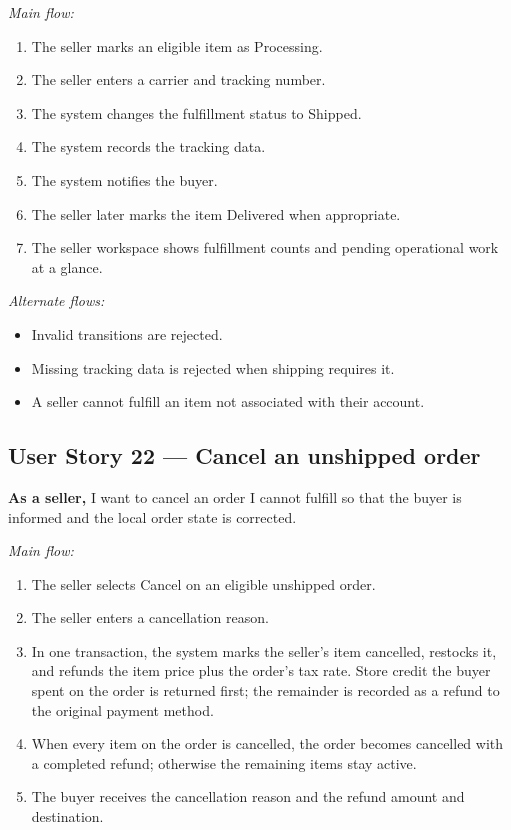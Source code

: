 \documentclass[11pt]{scrreprt}
\begin{document}
\textit{Main flow:}
\begin{enumerate}
\item The seller marks an eligible item as Processing.
\item The seller enters a carrier and tracking number.
\item The system changes the fulfillment status to Shipped.
\item The system records the tracking data.
\item The system notifies the buyer.
\item The seller later marks the item Delivered when appropriate.
\item The seller workspace shows fulfillment counts and pending operational
work at a glance.
\end{enumerate}

\textit{Alternate flows:}
\begin{itemize}
\item Invalid transitions are rejected.
\item Missing tracking data is rejected when shipping requires it.
\item A seller cannot fulfill an item not associated with their account.
\end{itemize}

\subsection{User Story 22 --- Cancel an unshipped order}
\textbf{As a seller,} I want to cancel an order I cannot fulfill so that the
buyer is informed and the local order state is corrected.

\textit{Main flow:}
\begin{enumerate}
\item The seller selects Cancel on an eligible unshipped order.
\item The seller enters a cancellation reason.
\item In one transaction, the system marks the seller's item cancelled, restocks
it, and refunds the item price plus the order's tax rate. Store credit the buyer
spent on the order is returned first; the remainder is recorded as a refund to
the original payment method.
\item When every item on the order is cancelled, the order becomes cancelled
with a completed refund; otherwise the remaining items stay active.
\item The buyer receives the cancellation reason and the refund amount and
destination.
\end{enumerate}
\end{document}
